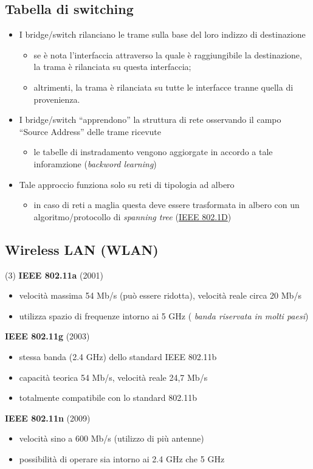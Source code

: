 \documentclass{book}
\begin{document}
\subsection{Tabella di switching}
\begin{itemize}
\item I bridge/switch rilanciano le trame sulla base del loro indizzo di destinazione
  \begin{itemize}
  \item se è nota l'interfaccia attraverso la quale è raggiungibile la destinazione, la trama è rilanciata su questa interfaccia;
  \item altrimenti, la trama è rilanciata su tutte le interfacce tranne quella di provenienza.
  \end{itemize}
\item I bridge/switch ``apprendono'' la struttura di rete osservando il campo ``Source Address'' delle trame ricevute
  \begin{itemize}
	\item le tabelle di instradamento vengono aggiorgate in accordo a tale inforamzione ({\it backword learning})
  \end{itemize}
 \item Tale approccio funziona solo su reti di tipologia ad albero 
  \begin{itemize}
	\item in caso di reti a maglia questa deve essere trasformata in albero con un algoritmo/protocollo di \textit{spanning tree} (\href{https://standards.ieee.org/ieee/802.1D/3387/}{IEEE 802.1D})
  \end{itemize} 
\end{itemize}
\subsection{Wireless LAN (WLAN)}
\begin{tasks}(3)
  \task \textbf{IEEE 802.11a} (2001)
  \begin{itemize}
  \item velocità massima 54 Mb/s (può essere ridotta), velocità reale circa
    20 Mb/s
    \item utilizza spazio di frequenze intorno ai 5 GHz ({ \it banda riservata in
        molti paesi})
  \end{itemize}
  \task \textbf{IEEE 802.11g} (2003)
  \begin{itemize}
  \item stessa banda (2.4 GHz) dello standard IEEE 802.11b
  \item capacità teorica 54 Mb/s, velocità reale 24,7 Mb/s
  \item totalmente compatibile con lo standard 802.11b
  \end{itemize}
  \task \textbf{IEEE 802.11n} (2009)
  \begin{itemize}
  \item velocità sino a 600 Mb/s (utilizzo di più antenne)
  \item possibilità di operare sia intorno ai 2.4 GHz che 5 GHz
  \end{itemize}
\end{tasks}
\end{document}

